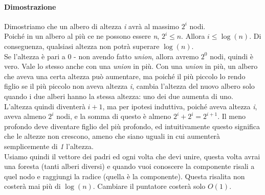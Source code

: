 \paragraph{Dimostrazione}
Dimostriamo che un albero di altezza \textit{i} avrà al massimo $2^i$ nodi. \\
Poiché in un albero al più ce ne possono essere \textit{n}, $2^i \le n$. Allora $i \le \log(n)$. Di conseguenza, qualsiasi altezza non potrà superare $\log(n)$. \\
Se l'altezza è pari a 0 - non avendo fatto \textit{union}, allora avremo $2^0$ nodi, quindi è vero. Vale lo stesso anche con una \textit{union} in più. Con una \textit{union} in più, un albero che aveva una certa altezza può aumentare, ma poiché il più piccolo lo rendo figlio se il più piccolo non aveva altezza \textit{i}, cambia l'altezza del nuovo albero solo quando i due alberi hanno la stessa altezza: uno dei due aumenta di uno. L'altezza quindi diventerà $i+1$, ma per ipotesi induttiva, poiché aveva altezza \textit{i}, aveva almeno $2^i$ nodi, e la somma di questo è almeno $2^i + 2^i = 2^{i+1}$. Il meno profondo deve diventare figlio del più profondo, ed intuitivamente questo significa che le altezze non crescono, ameno che siano uguali in cui aumenterà semplicemente di \textit{1} l'altezza. \\
Usiamo quindi il vettore dei padri ed ogni volta che devi unire, questa volta avrai una foresta (tanti alberi diversi) e quando vuoi conoscere la componente risali a quel nodo e raggiungi la radice (quella è la componente). Questa risalita non costerà mai più di $\log(n)$. Cambiare il puntatore costerà solo $O(1)$.